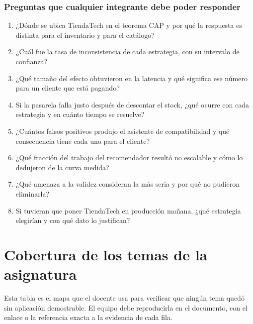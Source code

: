\documentclass[11pt,a4paper]{article}
\begin{document}
	\subsubsection{Preguntas que cualquier integrante debe poder responder}
	
	\begin{enumerate}[leftmargin=*,itemsep=3pt]
		\item ¿Dónde se ubica TiendaTech en el teorema CAP y por qué la respuesta es distinta para el inventario y para el catálogo?
		\item ¿Cuál fue la tasa de inconsistencia de cada estrategia, con su intervalo de confianza?
		\item ¿Qué tamaño del efecto obtuvieron en la latencia y qué significa ese número para un cliente que está pagando?
		\item Si la pasarela falla justo después de descontar el stock, ¿qué ocurre con cada estrategia y en cuánto tiempo se resuelve?
		\item ¿Cuántos falsos positivos produjo el asistente de compatibilidad y qué consecuencia tiene cada uno para el cliente?
		\item ¿Qué fracción del trabajo del recomendador resultó no escalable y cómo lo dedujeron de la curva medida?
		\item ¿Qué amenaza a la validez consideran la más seria y por qué no pudieron eliminarla?
		\item Si tuvieran que poner TiendaTech en producción mañana, ¿qué estrategia elegirían y con qué dato lo justifican?
	\end{enumerate}
	
	\section{Cobertura de los temas de la asignatura}
	
	Esta tabla es el mapa que el docente usa para verificar que ningún tema quedó sin aplicación demostrable. El equipo debe reproducirla en el documento, con el enlace o la referencia exacta a la evidencia de cada fila.
	
\end{document}
